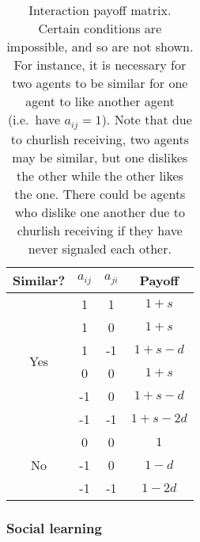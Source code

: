 \documentclass[11pt,letterpaper]{article}
\begin{document}
\begin{table}[h]
  \vspace{1em}
  \centering
  \begin{tabular}{cccc}
    Similar? & $a_{ij}$ & $a_{ji}$ & Payoff \\
    \toprule
    \multirow{6}{*}{Yes}   & 1 & 1   & $1 + s$ \\
       & 1 & 0   & $1 + s$ \\
       & 1 & -1  & $1 + s - d$ \\
       & 0 & 0   & $1 + s$ \\
       & -1 & 0  & $1 + s - d$ \\
       & -1 & -1 & $1 + s - 2d$ \\

    \midrule
    \multirow{3}{*}{No}    & 0 & 0   & $1$ \\
        & -1 & 0  & $1 - d$ \\
        & -1 & -1 & $1 - 2d$ \\
  \end{tabular}
  \caption{Interaction payoff matrix. Certain conditions are impossible, and so are not
  shown. For instance, it is necessary for two agents to be similar for 
  one agent to like another agent (i.e.\ have $a_{ij} = 1$). Note that
  due to churlish receiving, two agents may be similar, but one dislikes the
  other while the other likes the one. There could be agents who dislike one
  another due to churlish receiving if they have never signaled each other.}
  \label{tab:payoffs}
\end{table}

\subsubsection{Social learning}
\end{document}
